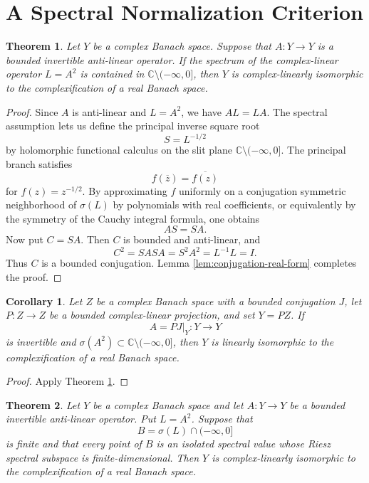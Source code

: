 \documentclass[11pt]{article}
\newtheorem{theorem}{Theorem}
\newtheorem{corollary}{Corollary}
\theoremstyle{remark}
\newcommand{\C}{\mathbb C}
\begin{document}
\section{A Spectral Normalization Criterion}

\begin{theorem}\label{thm:spectral-normalization}
Let \(Y\) be a complex Banach space.  Suppose that \(A:Y\to Y\) is a bounded
invertible anti-linear operator.  If the spectrum of the complex-linear
operator \(L=A^2\) is contained in \(\C\setminus(-\infty,0]\), then \(Y\) is
complex-linearly isomorphic to the complexification of a real Banach space.
\end{theorem}

\begin{proof}
Since \(A\) is anti-linear and \(L=A^2\), we have \(AL=LA\).  The spectral
assumption lets us define the principal inverse square root
\[
  S=L^{-1/2}
\]
by holomorphic functional calculus on the slit plane
\(\C\setminus(-\infty,0]\).  The principal branch satisfies
\[
  f(\overline z)=\overline{f(z)}
\]
for \(f(z)=z^{-1/2}\).  By approximating \(f\) uniformly on a conjugation
symmetric neighborhood of \(\sigma(L)\) by polynomials with real coefficients,
or equivalently by the symmetry of the Cauchy integral formula, one obtains
\[
  AS=SA .
\]
Now put \(C=SA\).  Then \(C\) is bounded and anti-linear, and
\[
  C^2=SASA=S^2A^2=L^{-1}L=I .
\]
Thus \(C\) is a bounded conjugation.  Lemma
\ref{lem:conjugation-real-form} completes the proof.
\end{proof}

\begin{corollary}\label{cor:projection-spectral}
Let \(Z\) be a complex Banach space with a bounded conjugation \(J\), let
\(P:Z\to Z\) be a bounded complex-linear projection, and set \(Y=PZ\).  If
\[
  A=PJ|_Y:Y\to Y
\]
is invertible and \(\sigma(A^2)\subset \C\setminus(-\infty,0]\), then \(Y\)
is linearly isomorphic to the complexification of a real Banach space.
\end{corollary}

\begin{proof}
Apply Theorem \ref{thm:spectral-normalization}.
\end{proof}

\begin{theorem}\label{thm:finite-bad-spectrum}
Let \(Y\) be a complex Banach space and let \(A:Y\to Y\) be a bounded
invertible anti-linear operator.  Put \(L=A^2\).  Suppose that
\[
  B=\sigma(L)\cap(-\infty,0]
\]
is finite and that every point of \(B\) is an isolated spectral value whose
Riesz spectral subspace is finite-dimensional.  Then \(Y\) is
complex-linearly isomorphic to the complexification of a real Banach space.
\end{theorem}
\end{document}
